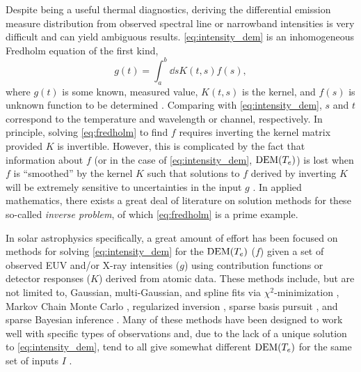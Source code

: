 Despite being a useful thermal diagnostics, deriving the differential emission measure distribution from observed spectral line or narrowband intensities is very difficult and can yield ambiguous results. \autoref{eq:intensity_dem} is an inhomogeneous Fredholm equation of the first kind,
\begin{equation}\label{eq:fredholm}
    g(t) = \int_a^b\dd{s}K(t,s)f(s),
\end{equation}
where $g(t)$ is some known, measured value, $K(t,s)$ is the kernel, and $f(s)$ is unknown function to be determined \citep{press_numerical_1992}. Comparing with \autoref{eq:intensity_dem}, $s$ and $t$ correspond to the temperature and wavelength or channel, respectively. In principle, solving \autoref{eq:fredholm} to find $f$ requires inverting the kernel matrix provided $K$ is invertible. However, this is complicated by the fact that information about $f$ (or in the case of \autoref{eq:intensity_dem}, $\textup{DEM}(T_e)$) is lost when $f$ is ``smoothed'' by the kernel $K$ such that solutions to $f$ derived by inverting $K$ will be extremely sensitive to uncertainties in the input $g$ \citep{press_numerical_1992}. In applied mathematics, there exists a great deal of literature on solution methods for these so-called \textit{inverse problem}, of which \autoref{eq:fredholm} is a prime example.

In solar astrophysics specifically, a great amount of effort has been focused on methods for solving \autoref{eq:intensity_dem} for the $\textup{DEM}(T_e)$ ($f$) given a set of observed EUV and/or X-ray intensities ($g$) using contribution functions or detector responses ($K$) derived from atomic data. These methods include, but are not limited to, Gaussian, multi-Gaussian, and spline fits via $\chi^2$-minimization \citep[e.g.][]{guennou_accuracy_2012,warren_observations_2013,ryan_compatibility_2014,caspi_constraining_2014}, Markov Chain Monte Carlo \citep[MCMC,][]{kashyap_markov-chain_1998}, regularized inversion \citep{hannah_differential_2012,plowman_fast_2013}, sparse basis pursuit \citep{cheung_thermal_2015}, and sparse Bayesian inference \citep{warren_sparse_2017}. Many of these methods have been designed to work well with specific types of observations and, due to the lack of a unique solution to \autoref{eq:intensity_dem}, tend to all give somewhat different $\textup{DEM}(T_e)$ for the same set of inputs $I$ \citep[see comparison of 15 different methods by][]{aschwanden_benchmark_2015}.

